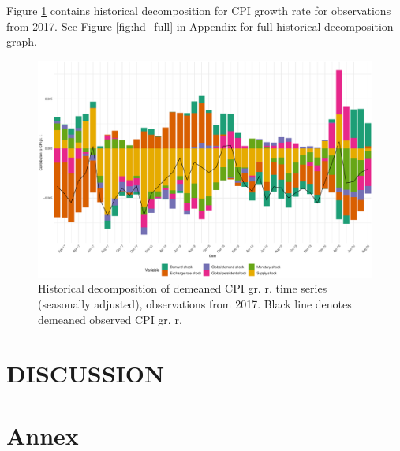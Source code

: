 \documentclass[12pt, a4paper]{extarticle}
\begin{document}
Figure \ref{fig:hd_cut} contains historical decomposition for CPI growth rate for observations from 2017. See Figure \ref{fig:hd_full} in Appendix for full historical decomposition graph.

\begin{figure}
	\centering
	\includegraphics[width=0.95\linewidth]{figures/hd_st_cut}
	\caption[]{Historical decomposition of demeaned CPI gr. r. time series (seasonally adjusted), observations from 2017. Black line denotes demeaned observed CPI gr. r.}
	\label{fig:hd_cut}
\end{figure}

\clearpage
\section*{DISCUSSION}


\renewcommand*{\newblockpunct}{\addperiod\space\bibsentence}
\newpage
\linespread{1.3}

\printbibliography
{}
\newpage
\setcounter{figure}{0}
\setcounter{table}{0}
\makeatletter
\renewcommand*{\thetable}{\alph{table}}
\renewcommand*{\thefigure}{\alph{figure}}
\let\c@table\c@figure
\makeatother 

\section*{Annex}
\label{app}
\end{document}
